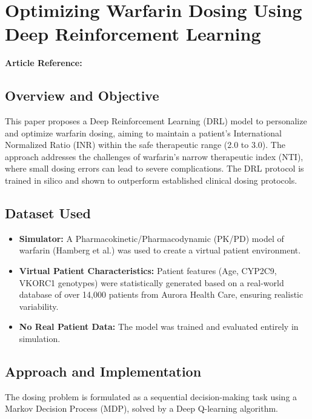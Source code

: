 \section{Optimizing Warfarin Dosing Using Deep Reinforcement Learning}
\textbf{Article Reference:} \cite{zadehOptimizingWarfarinDosing2023}

\subsection*{Overview and Objective}
This paper proposes a Deep Reinforcement Learning (DRL) model to personalize and optimize warfarin dosing, aiming to maintain a patient's International Normalized Ratio (INR) within the safe therapeutic range (2.0 to 3.0). The approach addresses the challenges of warfarin's narrow therapeutic index (NTI), where small dosing errors can lead to severe complications. The DRL protocol is trained in silico and shown to outperform established clinical dosing protocols.

\subsection*{Dataset Used}
\begin{itemize}
    \item \textbf{Simulator:} A Pharmacokinetic/Pharmacodynamic (PK/PD) model of warfarin (Hamberg et al.) was used to create a virtual patient environment.
    \item \textbf{Virtual Patient Characteristics:} Patient features (Age, CYP2C9, VKORC1 genotypes) were statistically generated based on a real-world database of over 14,000 patients from Aurora Health Care, ensuring realistic variability.
    \item \textbf{No Real Patient Data:} The model was trained and evaluated entirely in simulation.
\end{itemize}

\subsection*{Approach and Implementation}
The dosing problem is formulated as a sequential decision-making task using a Markov Decision Process (MDP), solved by a Deep Q-learning algorithm.

